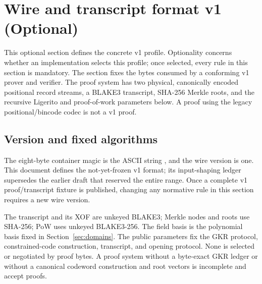 \section{Wire and transcript format v1 (Optional)}
\label{sec:wire-format}

\begingroup\small

\begin{normative}
This optional section defines the concrete v1 profile.  Optionality concerns
whether an implementation selects this profile; once selected, every rule in
this section is mandatory.  The section fixes the bytes consumed by a
conforming v1 prover and verifier.
The proof system has two physical, canonically encoded positional record streams, a
BLAKE3 transcript, SHA-256 Merkle roots, and the recursive Ligerito and
proof-of-work parameters below.  A proof using the legacy positional/bincode
codec is not a v1 proof.
\end{normative}

\subsection{Version and fixed algorithms}
\label{sec:wire-version}

The eight-byte container magic is the ASCII string ,
and the wire version is one.  This document defines the not-yet-frozen v1
format; its input-shaping ledger supersedes the earlier draft that reserved
the entire  range.  Once a complete v1 proof/transcript
fixture is published, changing any normative rule in this section requires a
new wire version.

The transcript and its XOF are unkeyed BLAKE3; Merkle nodes and roots use
SHA-256; PoW uses unkeyed BLAKE3-256.  The field basis is the polynomial basis
fixed in Section~\ref{sec:domains}.  The public parameters fix the
GKR protocol, constrained-code construction, transcript, and opening protocol.
None is selected or negotiated by proof bytes.  A proof system without a
byte-exact GKR ledger or without a canonical codeword construction and root
vectors is incomplete and \mustnot{} accept proofs.

